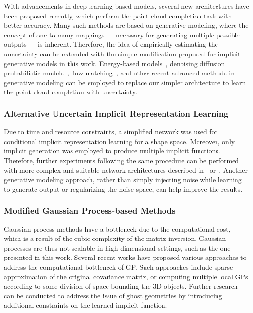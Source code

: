         With advancements in deep learning-based models, several new architectures have been proposed recently, which perform the point cloud completion task with better accuracy. Many such methods are based on generative modeling, where the concept of one-to-many mappings — necessary for generating multiple possible outputs — is inherent. Therefore, the idea of empirically estimating the uncertainty can be extended with the simple modification proposed for implicit generative models in this work. Energy-based models~\cite{EBResLT}, denoising diffusion probabilistic models~\cite{DDPM}, flow matching~\cite{PSF}, and other recent advanced methods in generative modeling can be employed to replace our simpler architecture to learn the point cloud completion with uncertainty.
    
        \subsubsection{Alternative Uncertain Implicit Representation Learning}
        Due to time and resource constraints, a simplified network was used for conditional implicit representation learning for a shape space. Moreover, only implicit generation was employed to produce multiple implicit functions. Therefore, further experiments following the same procedure can be performed with more complex and suitable network architectures described in~\cite{DiGS} or~\cite{NeuralHessian}. Another generative modeling approach, rather than simply injecting noise while learning to generate output or regularizing the noise space, can help improve the results.
    
        \subsubsection{Modified Gaussian Process-based Methods}
        Gaussian process methods have a bottleneck due to the computational cost, which is a result of the cubic complexity of the matrix inversion. Gaussian processes are thus not scalable in high-dimensional settings, such as the one presented in this work. Several recent works have proposed various approaches to address the computational bottleneck of GP. Such approaches include sparse approximation of the original covariance matrix, or computing multiple local GPs according to some division of space bounding the 3D objects. Further research can be conducted to address the issue of ghost geometries by introducing additional constraints on the learned implicit function.

